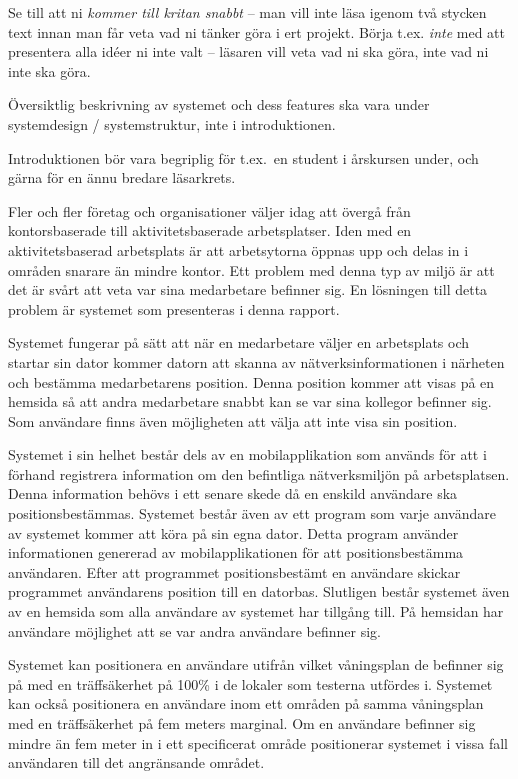 \documentclass[a4paper,12pt]{article}
\begin{document}
 Se till att ni \emph{kommer till kritan snabbt} – man vill inte läsa igenom två stycken text innan man får veta vad ni tänker göra i ert projekt.  Börja t.ex. \emph{inte} med att presentera alla idéer ni inte valt – läsaren vill veta vad ni ska göra, inte vad ni inte ska göra.

 Översiktlig beskrivning av systemet och dess features ska vara under systemdesign / systemstruktur, inte i introduktionen.

 Introduktionen bör vara begriplig för t.ex.~en student i årskursen under, och gärna för en ännu bredare läsarkrets.
 \fi

 Fler och fler företag och organisationer väljer idag att övergå från kontorsbaserade till aktivitetsbaserade arbetsplatser. Iden med en aktivitetsbaserad arbetsplats är att arbetsytorna öppnas upp och delas in i områden snarare än mindre kontor. Ett problem med denna typ av miljö är att det är svårt att veta var sina medarbetare befinner sig. En lösningen till detta problem är systemet som presenteras i denna rapport.

 Systemet fungerar på sätt att när en medarbetare väljer en arbetsplats och startar sin dator kommer datorn att skanna av nätverksinformationen i närheten och bestämma medarbetarens position. Denna position kommer att visas på en hemsida så att andra medarbetare snabbt kan se var sina kollegor befinner sig. Som användare finns även möjligheten att välja att inte visa sin position.

 Systemet i sin helhet består dels av en mobilapplikation som används för att i förhand registrera information om den befintliga nätverksmiljön på arbetsplatsen. Denna information behövs i ett senare skede då en enskild användare ska positionsbestämmas. Systemet består även av ett program som varje användare av systemet kommer att köra på sin egna dator. Detta program använder informationen genererad av mobilapplikationen för att positionsbestämma användaren. Efter  att programmet positionsbestämt en användare skickar programmet användarens position till en datorbas. Slutligen består systemet även av en hemsida som alla användare av systemet har tillgång till. På hemsidan har användare möjlighet att se var andra användare befinner sig.

 Systemet kan positionera en användare utifrån vilket våningsplan de befinner sig på med en träffsäkerhet på 100\% i de lokaler som testerna utfördes i. Systemet kan också positionera en användare inom ett områden på samma våningsplan med en träffsäkerhet på fem meters marginal. Om en användare befinner sig mindre än fem meter in i ett specificerat område positionerar systemet i vissa fall användaren till det angränsande området.
\end{document}
